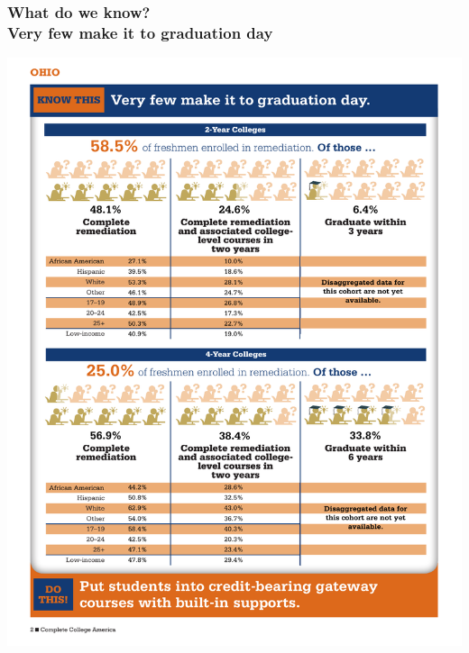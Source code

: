\documentclass[13pt]{beamer}
\newcounter{a}
\newcounter{b}
\begin{document}
\begin{frame}
  \frametitle{What do we know? \\ Very few make it to graduation day}

  \includegraphics[clip,trim=0cm 18.6cm 0cm 3cm, width=\textwidth]{very-few-make-it-to-graduation.pdf}
\end{frame}
\end{document}

